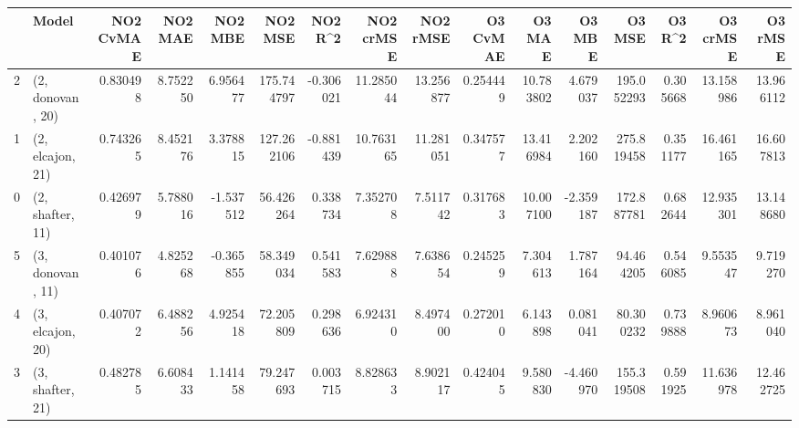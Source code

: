 \begin{tabular}{llrrrrrrrrrrrrrr}
\toprule
{} &             Model &  NO2 CvMAE &   NO2 MAE &   NO2 MBE &     NO2 MSE &   NO2 R\textasciicircum2 &  NO2 crMSE &   NO2 rMSE &  O3 CvMAE &     O3 MAE &    O3 MBE &      O3 MSE &    O3 R\textasciicircum2 &   O3 crMSE &    O3 rMSE \\
\midrule
2 &  (2, donovan, 20) &   0.830498 &  8.752250 &  6.956477 &  175.744797 & -0.306021 &  11.285044 &  13.256877 &  0.254449 &  10.783802 &  4.679037 &  195.052293 &  0.305668 &  13.158986 &  13.966112 \\
1 &  (2, elcajon, 21) &   0.743265 &  8.452176 &  3.378815 &  127.262106 & -0.881439 &  10.763165 &  11.281051 &  0.347577 &  13.416984 &  2.202160 &  275.819458 &  0.351177 &  16.461165 &  16.607813 \\
0 &  (2, shafter, 11) &   0.426979 &  5.788016 & -1.537512 &   56.426264 &  0.338734 &   7.352708 &   7.511742 &  0.317683 &  10.007100 & -2.359187 &  172.887781 &  0.682644 &  12.935301 &  13.148680 \\
5 &  (3, donovan, 11) &   0.401076 &  4.825268 & -0.365855 &   58.349034 &  0.541583 &   7.629888 &   7.638654 &  0.245259 &   7.304613 &  1.787164 &   94.464205 &  0.546085 &   9.553547 &   9.719270 \\
4 &  (3, elcajon, 20) &   0.407072 &  6.488256 &  4.925418 &   72.205809 &  0.298636 &   6.924310 &   8.497400 &  0.272010 &   6.143898 &  0.081041 &   80.300232 &  0.739888 &   8.960673 &   8.961040 \\
3 &  (3, shafter, 21) &   0.482785 &  6.608433 &  1.141458 &   79.247693 &  0.003715 &   8.828633 &   8.902117 &  0.424045 &   9.580830 & -4.460970 &  155.319508 &  0.591925 &  11.636978 &  12.462725 \\
\bottomrule
\end{tabular}
